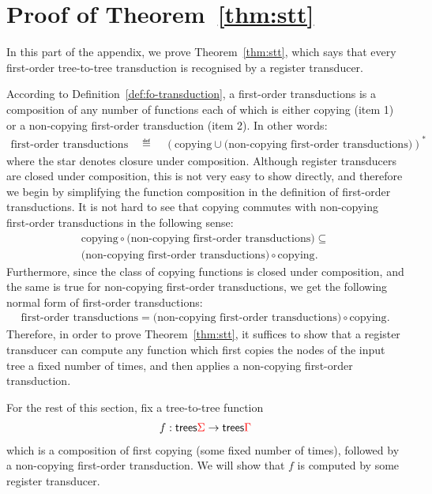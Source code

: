 \section{Proof of Theorem~\ref{thm:stt}}
In this part of the appendix, we prove Theorem~\ref{thm:stt}, which says that every first-order tree-to-tree transduction is recognised by a register transducer. 

According to Definition~\ref{def:fo-transduction}, a first-order transductions is a composition of any number of functions each of which is either  copying (item 1) or a non-copying first-order transduction (item 2). In other words:
\begin{align*}
\text{first-order transductions} \quad \eqdef \quad (\text{copying} \cup \text{(non-copying first-order transductions)})^*
\end{align*}
where the star denotes closure under composition. Although register transducers are closed under composition, this is not very   easy to show directly, and therefore we begin by simplifying the function composition in the definition of first-order transductions.  It is not hard to see that copying commutes with non-copying first-order transductions in the following sense:
\begin{align*}
    \text{copying} \circ  \text{(non-copying first-order transductions)}  \subseteq   \\ \text{(non-copying first-order transductions)} \circ \text{copying}.
    \end{align*}
Furthermore, since the class of copying functions is closed under composition, and the same is true for non-copying first-order transductions, we get the following normal form of first-order transductions:
\begin{align*}
    \text{first-order transductions} =  \text{(non-copying first-order transductions)} \circ \text{copying}.
    \end{align*}
Therefore, in order to prove Theorem~\ref{thm:stt}, it suffices to show that a register transducer can compute any function which first copies the nodes of the input tree a fixed number of times, and then applies a non-copying first-order transduction. 

For the rest of this section, fix  a tree-to-tree function
\begin{align*}
f : \mathsf {trees} {\color{red}{\Sigma}} \to \mathsf {trees} {\color{red}{\Gamma}}
\end{align*}
which is a composition of first copying (some fixed number of times), followed by a non-copying first-order transduction. We will show that $f$ is computed by some register transducer.  

